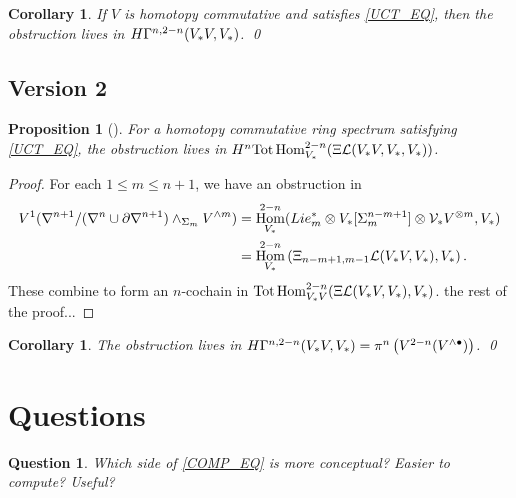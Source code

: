 \documentclass[11pt,reqno
,draft
]{amsart}
\numberwithin{equation}{section}
\numberwithin{figure}{section}
\newtheorem{proposition}[equation]{Proposition}%
\newtheorem{corollary}[equation]{Corollary}%
\newtheorem{question}[equation]{Question}
\theoremstyle{definition} %
\DeclareMathOperator{\Hom}{Hom}%
\newcommand{\V}{\ensuremath{\mathcal V}}
\newcommand{\Ksi}{\Xi}
\newcommand{\Loday}{\mathcal L}
\begin{document}
\begin{corollary}
        If $V$ is homotopy commutative and satisfies \cref{UCT_EQ}, then the obstruction lives in
        $H \Gamma^{n, 2-n}(V_{\**} V, V_{\**})$. \qed
\end{corollary}

\subsection{Version 2}
\begin{proposition}[{\cite[Prop. 5.4]{Rob03}}]
        For a homotopy commutative ring spectrum satisfying \cref{UCT_EQ},
        the obstruction lives in $H^n\mathrm{Tot} \Hom_{V_{\**}}^{2-n}(\Ksi \Loday(V_{\**}V, V_{\**}, V_{\**}))$.
\end{proposition}
\begin{proof}
        For each $1 \leq m \leq n+1$, we have an obstruction in
        \begin{align*}
                V^1(\nabla^{n+1}/(\nabla^n \cup \partial \nabla^{n+1}) \wedge_{\Sigma_m} V^{\wedge m})
          & =
            \Hom_{V_{\**}}^{2-n}(Lie_m^{\**} \otimes V_{\**}[\Sigma_m^{n-m+1}] \otimes \V_{\**}V^{\otimes m}, V_{\**}) \\
          & = 
            \Hom_{V_{\**}}^{2-n}\left( \Ksi_{n-m+1, m-1}\Loday(V_{\**}V, V_{\**}), V_{\**} \right).
        \end{align*}
        These combine to form an $n$-cochain in $\mathrm{Tot}\Hom_{V_{\**}V}^{2-n}(\Ksi \Loday(V_{\**}V, V_{\**}), V_{\**})$.
        {\color{red} the rest of the proof...}
\end{proof}

\begin{corollary}
        The obstruction lives in
        $H \Gamma^{n, 2-n}(V_{\**} V, V_{\**}) = \pi^n \left( V^{2-n}(V^{\wedge \bullet}) \right)$. \qed
\end{corollary}

\section{Questions}

\begin{question}
        Which side of \cref{COMP_EQ} is more conceptual? Easier to compute? Useful?
\end{question}



{}
 
\end{document}
